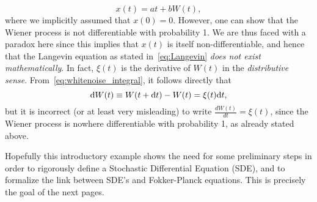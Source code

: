 \begin{equation}
	x(t) = at + bW(t),
\end{equation}
where we implicitly assumed that $x(0) = 0$. However, one can show that the Wiener process is not differentiable with probability 1. We are thus faced with a paradox here since this implies that $x(t)$ is itself non-differentiable, and hence that the Langevin equation as stated in~\eqref{eq:Langevin} \textit{does not exist mathematically}. In fact, $\xi(t)$ is the derivative of $W(t)$ in the \textit{distributive sense}. From~\eqref{eq:whitenoise_integral}, it follows directly that
\begin{equation}\label{eq:dW}
	\rm dW(t) \equiv W(t+\rm dt) - W(t) = \xi(t) \rm dt,
\end{equation}
but it is incorrect (or at least very misleading) to write $\frac{dW(t)}{dt} = \xi(t)$, since the Wiener process is nowhere differentiable with probability 1, as already stated above.

Hopefully this introductory example shows the need for some preliminary steps in order to rigorously define a Stochastic Differential Equation (SDE), and to formalize the link between SDE's and Fokker-Planck equations. This is precisely the goal of the next pages.

